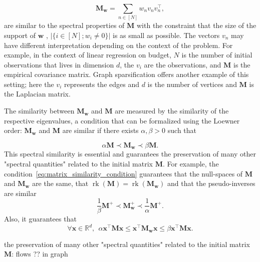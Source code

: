 \documentclass[twoside,11pt]{book}
\numberwithin{theorem}{chapter}
\numberwithin{definition}{chapter}
\numberwithin{proposition}{chapter}
\numberwithin{corollary}{chapter}
\numberwithin{example}{chapter}
\numberwithin{lemma}{chapter}
\numberwithin{assumption}{chapter}
\DeclareMathOperator{\rank}{\mathrm{rk}}
\DeclareMathOperator{\Tran}{\intercal}
\begin{document}
\begin{equation}
\bm{M}_{\bm{w}} = \sum\limits_{n \in [N]} w_{n} v_{n}v_{n}^{\Tran},
\end{equation}
are similar to the spectral properties of $\bm{M}$ with the constraint that the size of the support of $\bm{w}$ , $|\{ i \in [N]; w_{i} \neq 0 \}|$ is as small as possible. 
The vectors $v_{n}$ may have different interpretation depending on the context of the problem. For example, in the context of linear regression on budget, $N$ is the number of initial observations that lives in dimension $d$, the $v_{i}$ are the observations, and $\bm{M}$ is the empirical covariance matrix. Graph sparsification offers another example of this setting; here the $v_{i}$ represents the edges and $d$ is the number of vertices and $\bm{M}$ is the Laplacian matrix.




The similarity between $\bm{M}_{\bm{w}}$ and $\bm{M}$ are measured by the similarity of the respective eigenvalues, a condition that can be formalized using the Loewner order: $\bm{M}_{\bm{w}}$ and $\bm{M}$  are similar if there exists $\alpha,\beta>0$ such that

\begin{equation}\label{eq:matrix_similarity_condition}
\alpha \bm{M} \prec \bm{M}_{\bm{w}} \prec \beta \bm{M}.
\end{equation}
This spectral similarity is essential 
and guarantees the preservation of many other "spectral quantities" related to the initial matrix $\bm{M}$. For example, the condition~\eqref{eq:matrix_similarity_condition} guarantees that the null-spaces of $\bm{M}$ and $\bm{M}_{\bm{w}}$ are the same, that $\rank(\bm{M}) = \rank(\bm{M}_{\bm{w}})$ and that the pseudo-inverses are similar \citep{MiAk77}
\begin{equation}
\frac{1}{\beta} \bm{M}^{+} \prec \bm{M}_{\bm{w}}^{+} \prec \frac{1}{\alpha} \bm{M}^{+}.
\end{equation}
Also, it guarantees that 
\begin{equation}
\forall \bm{x} \in \mathbb{R}^{d}, \:\:
\alpha \bm{x}^{\Tran}\bm{M}\bm{x} \leq \bm{x}^{\Tran}\bm{M}_{\bm{w}}\bm{x} \leq \beta \bm{x}^{\Tran}\bm{M}\bm{x}.
\end{equation}

the preservation of many other "spectral quantities" related to the initial matrix $\bm{M}$: flows ?? in graph 
\end{document}
